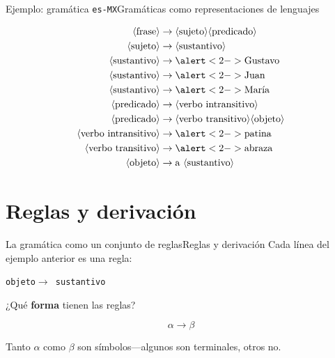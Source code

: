 \documentclass[spanish]{beamer}
\begin{document}
\begin{frame}{Ejemplo: gramática \texttt{es-MX}}{Gramáticas como representaciones de lenguajes}

    \begin{align*}
        \langle \text{frase} \rangle & \to \langle \text{sujeto} \rangle \langle \text{predicado} \rangle\\
        \langle \text{sujeto} \rangle & \to \langle \text{sustantivo} \rangle\\
        \langle \text{sustantivo} \rangle & \to \alert<2->{\text{Gustavo}}\\
        \langle \text{sustantivo} \rangle & \to \alert<2->{\text{Juan}}\\
        \langle \text{sustantivo} \rangle & \to \alert<2->{\text{María}}\\
        \langle \text{predicado} \rangle & \to \langle \text{verbo intransitivo} \rangle\\
        \langle \text{predicado} \rangle & \to \langle \text{verbo transitivo} \rangle \langle \text{objeto}\rangle\\
        \langle \text{verbo intransitivo} \rangle & \to \alert<2->{\text{patina}}\\
        \langle \text{verbo transitivo} \rangle & \to \alert<2->{\text{abraza}}\\
        \langle \text{objeto} \rangle & \to \text{a } \langle \text{sustantivo} \rangle
    \end{align*}


\end{frame}

\section{Reglas y derivación}

\begin{frame}{La gramática como un conjunto de reglas}{Reglas y derivación}
    Cada línea del ejemplo anterior es una \alert{regla}:
    
    \bigskip

    \begin{center}
        {\large \texttt{\textlangle objeto\textrangle \quad $\to$ \quad \textlangle sustantivo\textrangle}}
    \end{center}  \pause
    
    \bigskip

    ¿Qué \textbf{forma} tienen las reglas? \pause
    
    \[\alpha \to \beta\] \pause

    Tanto $\alpha$ como $\beta$ son símbolos---algunos son terminales, otros no.

\end{frame}
\end{document}
